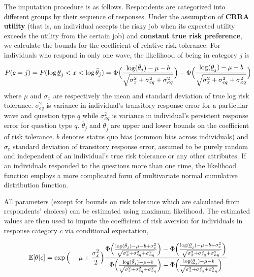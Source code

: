 \documentclass[]{article}
\begin{document}
The imputation procedure is as follows. Respondents are categorized into different groups by their sequence of responses. Under the assumption of \textbf{CRRA utility} (that is, an individual accepts the risky job when its expected utility exceeds the utility from the certain job) and \textbf{constant true risk preference}, we calculate the bounds for the coefficient of relative risk tolerance. For individuals who respond in only one wave, the likelihood of being in category $j$ is 
\begin{equation}
	P(c=j)=P(\log\underline{\theta}_j<x<\log\bar{\theta}_j)=\Phi\Big({\log(\bar{\theta}_j)-\mu-b\over\sqrt{\sigma_x^2+\sigma_{eq}^2+\sigma_{\kappa q}^2}}\Big)-\Phi\Big({\log(\underline{\theta}_j)-\mu-b\over\sqrt{\sigma_x^2+\sigma_{eq}^2+\sigma_{\kappa q}^2}}\Big)
	\label{eq:1-likelihood-constant}
\end{equation} 
where $\mu$ and $\sigma_x$ are respectively the mean and standard deviation of true log risk tolerance. $\sigma_{eq}^2$ is variance in individual's transitory response error for a particular wave and question type $q$ while $\sigma_{\kappa q}^2$ is variance in individual's persistent response error for question type $q$. $\bar \theta_j$ and $\underline{\theta}_j$ are upper and lower bounds on the coefficient of risk tolerance. $b$ denotes status quo bias (common bias across individuals) and $\sigma_e$ standard deviation of transitory response error, assumed to be purely random and independent of an individual's true risk tolerance or any other attributes. If an individuals responded to the questions more than one time, the likelihood function employs a more complicated form of multivariate normal cumulative distribution function.

All parameters (except for bounds on risk tolerance which are calculated from respondents' choices) can be estimated using maximum likelihood. The estimated values are then used to impute the coefficient of risk aversion for individuals in response category $c$ via conditional expectation,

\begin{equation}
	\mathbb E[\theta|c]=\exp\Big(-\mu+{\sigma_x^2\over 2}\Big){\Phi\Big({\log(\bar{\theta}_j)-\mu-b+\sigma_x^2\over \sqrt{\sigma_x^2+\sigma_{eq}^2+\sigma_{\kappa q}^2}}\Big)-\Phi\Big({\log(\underline{\theta}_j)-\mu-b+\sigma_x^2\over \sqrt{\sigma_x^2+\sigma_{eq}^2+\sigma_{\kappa q}^2}}\Big)\over \Phi\Big({\log(\bar{\theta}_j)-\mu-b\over \sqrt{\sigma_x^2+\sigma_{eq}^2+\sigma_{\kappa q}^2}}\Big)-\Phi\Big({\log(\underline{\theta}_j)-\mu-b\over \sqrt{\sigma_x^2+\sigma_{eq}^2+\sigma_{\kappa q}^2}}\Big)}
	\label{eq:2-conditional-expectation}
\end{equation}
\end{document}

